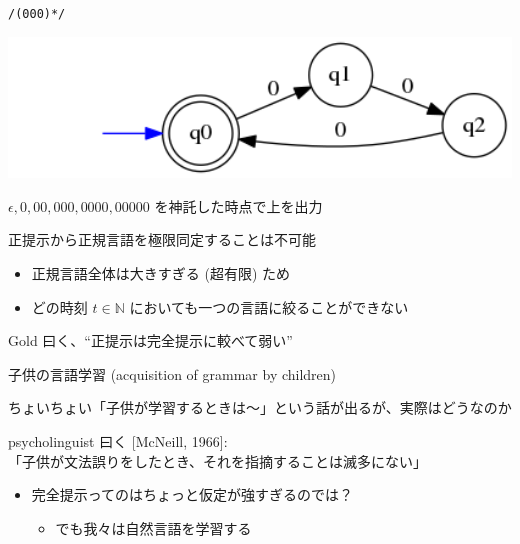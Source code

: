 \documentclass[professionalfont, 12pt, dvipdfmx, default, cjk]{beamer}
\begin{document}
\begin{frame}{\texttt{/(000)*/}}

\includegraphics[width=1.0\textwidth,bb=0 0 413 116]{img/5.png}

\vfill
\(\epsilon, 0, 00, 000, 0000, 00000\) を神託した時点で上を出力

\end{frame}

\begin{frame}{正提示から正規言語を極限同定することは不可能}

\begin{itemize}
\itemsep1pt\parskip0pt
\item
  正規言語全体は大きすぎる (超有限) ため
\item
  どの時刻 \(t \in \mathbb{N}\) においても一つの言語に絞ることができない
\end{itemize}

\vfill
Gold 曰く、``正提示は完全提示に較べて弱い''

\end{frame}

\begin{frame}{子供の言語学習 (acquisition of grammar by children)}

ちょいちょい「子供が学習するときは〜」という話が出るが、実際はどうなのか

\vspace*{3mm}

psycholinguist 曰く {[}McNeill,
1966{]}:\\「子供が文法誤りをしたとき、それを指摘することは滅多にない」

\flushleft
\vspace*{3mm}

\begin{itemize}
\itemsep1pt\parskip0pt
\item
  完全提示ってのはちょっと仮定が強すぎるのでは？

  \begin{itemize}
  \itemsep1pt\parskip0pt
  \item
    でも我々は自然言語を学習する
  \end{itemize}
\end{itemize}

\end{frame}
\end{document}
